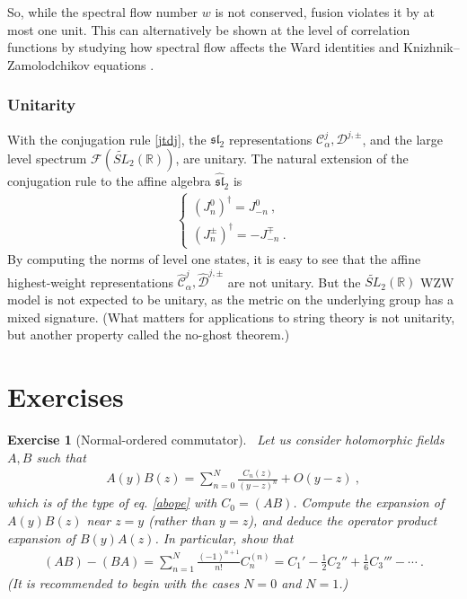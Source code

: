 \documentclass[12pt, a4paper, notitlepage, twoside]{report}
\numberwithin{equation}{section}
\theoremstyle{break}
\newtheorem{exo}{Exercise}[chapter]
\begin{document}
So, while the spectral flow number $w$ is not conserved, fusion violates it by at most one unit.
This can alternatively be shown at the level of correlation functions by studying how spectral flow affects the Ward identities and Knizhnik--Zamolodchikov equations \cite{rib05}.

\subsubsection{Unitarity}

With the conjugation rule \eqref{jtdj}, the $\mathfrak{sl}_2$ representations $\mathcal{C}^j_\alpha,\mathcal{D}^{j,\pm}$, and the large level spectrum $\mathcal{F}(\widetilde{SL}_2(\mathbb{R}))$, are unitary.
The natural extension of the conjugation rule to the affine algebra $\widehat{\mathfrak{sl}}_2$ is
\begin{align}
 \left\{\begin{array}{l} (J_n^0)^\dagger = J_{-n}^0\ , \\
         (J_n^\pm)^\dagger = -J_{-n}^\mp \ .
        \end{array}
\right.
\end{align}
By computing the norms of level one states, it is easy to see that the affine highest-weight representations $\hat{\mathcal{C}}^j_\alpha, \hat{\mathcal{D}}^{j,\pm}$  are not unitary.
But the $\widetilde{SL}_2(\mathbb{R})$ WZW model is not expected to be unitary, as the metric on the underlying group has a mixed signature. (What matters for applications to string theory is not unitarity, but another property called the no-ghost theorem.) 

\section{Exercises}

\begin{exo}[Normal-ordered commutator]
~\label{exoabba}
Let us consider holomorphic fields $A,B$ such that 
\begin{align}
 A(y)B(z) = \sum_{n=0}^N \frac{C_n(z)}{(y-z)^n} + O(y-z)\ ,
\end{align}
which is of the type of eq. \eqref{abope} with $C_0 = (AB)$. 
Compute the expansion of $A(y)B(z)$ near $z=y$ (rather than $y=z$), and deduce the operator product expansion of $B(y)A(z)$. 
In particular, show that 
\begin{align}
 (AB)-(BA) = \sum_{n=1}^N \frac{(-1)^{n+1}}{n!} C_n^{(n)} = C_1'-\frac12 C_2'' + \frac16 C_3''' -\cdots \ .
\end{align}
(It is recommended to begin with the cases $N=0$ and $N=1$.)
\end{exo}
\end{document}
